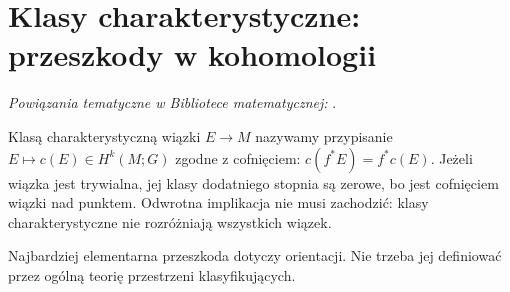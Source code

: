 \section{Klasy charakterystyczne: przeszkody w kohomologii}
\label{sec:klasy-char-16}

\noindent\emph{Powiązania tematyczne w Bibliotece matematycznej:} .


\begin{definicja}
Klasą charakterystyczną
wiązki $E\to M$ nazywamy
przypisanie $E\mapsto c(E)
\in H^k(M;G)$ zgodne
z cofnięciem:
$c(f^*E)=f^*c(E)$.
Jeżeli wiązka jest trywialna,
jej klasy dodatniego stopnia
są zerowe, bo jest cofnięciem
wiązki nad punktem.
Odwrotna implikacja
nie musi zachodzić:
klasy charakterystyczne
nie rozróżniają wszystkich
wiązek.
\end{definicja}

Najbardziej elementarna
przeszkoda dotyczy
orientacji. Nie trzeba
jej definiować przez
ogólną teorię przestrzeni
klasyfikujących.

